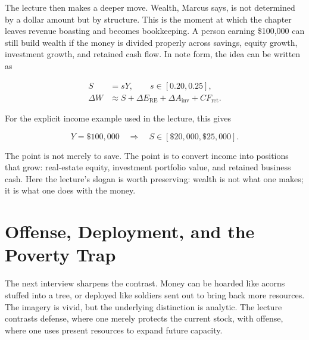 \begin{figure}
\centering
{}
\end{figure}

The lecture then makes a deeper move. Wealth, Marcus says, is not determined by a dollar amount but by structure. This is the moment at which the chapter leaves revenue boasting and becomes bookkeeping. A person earning \$100{,}000 can still build wealth if the money is divided properly across savings, equity growth, investment growth, and retained cash flow. In note form, the idea can be written as

\begin{align}
S &= sY, \qquad s\in[0.20,0.25], \\
\Delta W &\approx S+\Delta E_{\mathrm{RE}}+\Delta A_{\mathrm{inv}}+CF_{\mathrm{ret}}.
\end{align}

For the explicit income example used in the lecture, this gives

\begin{equation}
Y=\$100{,}000
\quad\Longrightarrow\quad
S\in[\$20{,}000,\$25{,}000].
\end{equation}

The point is not merely to save. The point is to convert income into positions that grow: real-estate equity, investment portfolio value, and retained business cash. Here the lecture's slogan is worth preserving: wealth is not what one makes; it is what one does with the money.

\section{Offense, Deployment, and the Poverty Trap}

The next interview sharpens the contrast. Money can be hoarded like acorns stuffed into a tree, or deployed like soldiers sent out to bring back more resources. The imagery is vivid, but the underlying distinction is analytic. The lecture contrasts defense, where one merely protects the current stock, with offense, where one uses present resources to expand future capacity.

